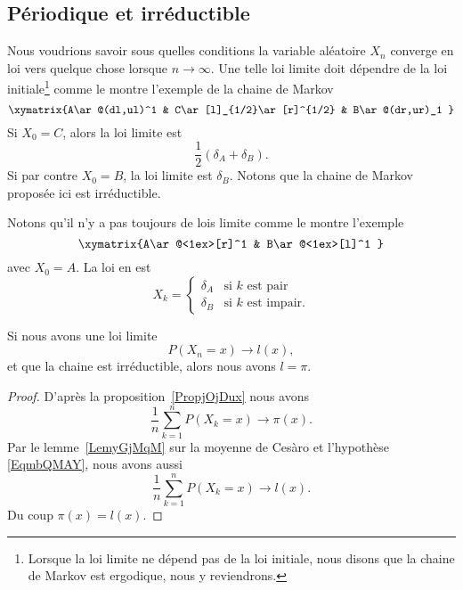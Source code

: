 \subsection{Périodique et irréductible}

Nous voudrions savoir sous quelles conditions la variable aléatoire \( X_n\) converge en loi vers quelque chose lorsque \( n\to \infty\). Une telle loi limite doit dépendre de la loi initiale\footnote{Lorsque la loi limite ne dépend pas de la loi initiale, nous disons que la chaine de Markov est ergodique, nous y reviendrons.} comme le montre l'exemple de la chaine de Markov
\begin{equation}
	\xymatrix{%
		A\ar@(dl,ul)^1  & C\ar[l]_{1/2}\ar[r]^{1/2} &  B\ar@(dr,ur)_1
	}
\end{equation}
Si \( X_0=C\), alors la loi limite est
\begin{equation}
	\frac{ 1 }{2}(\delta_A+\delta_B).
\end{equation}
Si par contre \( X_0=B\), la loi limite est \(\delta_B\). Notons que la chaine de Markov proposée ici est irréductible.

Notons qu'il n'y a pas toujours de lois limite comme le montre l'exemple
\begin{equation}
	\xymatrix{%
		A\ar@<1ex>[r]^1  & B\ar@<1ex>[l]^1
	}
\end{equation}
avec \( X_0=A\). La loi en est
\begin{equation}
	X_k=\begin{cases}
		\delta_A & \text{si } k\text{ est pair}    \\
		\delta_B & \text{si } k\text{ est impair}.
	\end{cases}
\end{equation}


\begin{lemma}
	Si nous avons une loi limite
	\begin{equation}    \label{EqmbQMAY}
		P(X_n=x)\to l(x),
	\end{equation}
	et que la chaine est irréductible, alors nous avons \( l=\pi\).
\end{lemma}

\begin{proof}
	D'après la proposition~\ref{PropjOjDux} nous avons
	\begin{equation}
		\frac{1}{ n }\sum_{k=1}^nP(X_k=x)\to \pi(x).
	\end{equation}
	Par le lemme~\ref{LemyGjMqM} sur la moyenne de Cesàro et l'hypothèse \eqref{EqmbQMAY}, nous avons aussi
	\begin{equation}
		\frac{1}{ n }\sum_{k=1}^nP(X_k=x)\to l(x).
	\end{equation}
	Du coup \( \pi(x)=l(x)\).
\end{proof}

